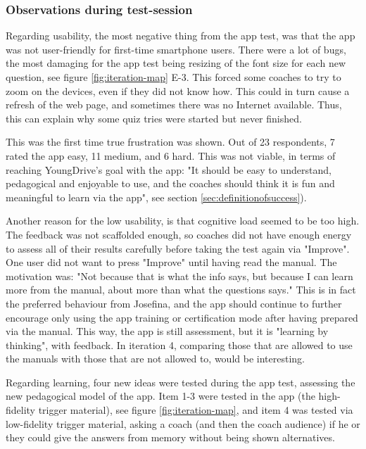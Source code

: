   \subsubsection{Observations during test-session}

  Regarding usability, the most negative thing from the app test, was that the app was not user-friendly for first-time smartphone users. There were a lot of bugs, the most damaging for the app test being resizing of the font size for each new question, see figure \ref{fig:iteration-map} E-3. This forced some coaches to try to zoom on the devices, even if they did not know how. This could in turn cause a refresh of the web page, and sometimes there was no Internet available. Thus, this can explain why some quiz tries were started but never finished.

  This was the first time true frustration was shown. Out of 23 respondents, 7 rated the app easy, 11 medium, and 6 hard. This was not viable, in terms of reaching YoungDrive's goal with the app: "It should be easy to understand, pedagogical and enjoyable to use, and the coaches should think it is fun and meaningful to learn via the app", see section \ref{sec:definitionofsuccess}).

  Another reason for the low usability, is that cognitive load seemed to be too high. The feedback was not scaffolded enough, so coaches did not have enough energy to assess all of their results carefully before taking the test again via "Improve". One user did not want to press "Improve" until having read the manual. The motivation was: "Not because that is what the info says, but because I can learn more from the manual, about more than what the questions says." This is in fact the preferred behaviour from Josefina, and the app should continue to further encourage only using the app training or certification mode after having prepared via the manual. This way, the app is still assessment, but it is "learning by thinking", with feedback. In iteration 4, comparing those that are allowed to use the manuals with those that are not allowed to, would be interesting.

  Regarding learning, four new ideas were tested during the app test, assessing the new pedagogical model of the app. Item 1-3 were tested in the app (the high-fidelity trigger material), see figure \ref{fig:iteration-map}, and item 4 was tested via low-fidelity trigger material, asking a coach (and then the coach audience) if he or they could give the answers from memory without being shown alternatives.

